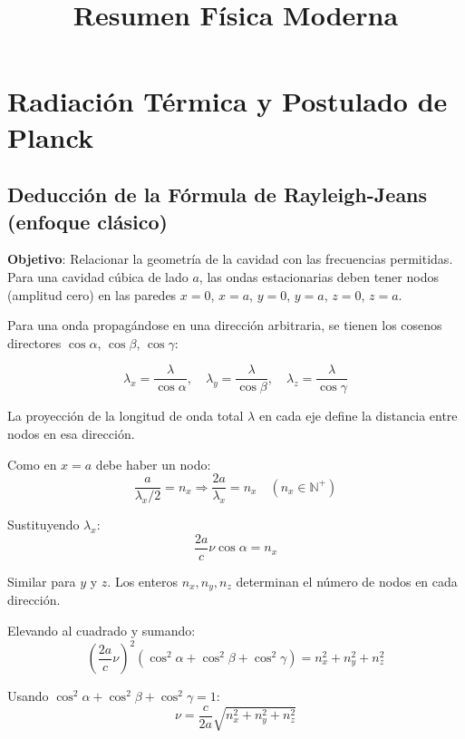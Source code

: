 \documentclass{article}
\title{Resumen Física Moderna}
\author{}
\date{}
\begin{document}
	\maketitle
	
	\section{Radiación Térmica y Postulado de Planck}
	\subsection{Deducción de la Fórmula de Rayleigh-Jeans (enfoque clásico)}
	
	\textbf{Objetivo}: Relacionar la geometría de la cavidad con las frecuencias permitidas. Para una cavidad cúbica de lado \(a\), las ondas estacionarias deben tener nodos (amplitud cero) en las paredes \(x=0\), \(x=a\), \(y=0\), \(y=a\), \(z=0\), \(z=a\).

	Para una onda propagándose en una dirección arbitraria, se tienen los cosenos directores \(\cos\alpha\), \(\cos\beta\), \(\cos\gamma\):
	
	\begin{equation}
		\lambda_x = \frac{\lambda}{\cos\alpha},\quad \lambda_y = \frac{\lambda}{\cos\beta},\quad \lambda_z = \frac{\lambda}{\cos\gamma}
	\end{equation}
	
	La proyección de la longitud de onda total \(\lambda\) en cada eje define la distancia entre nodos en esa dirección.
	
	Como en \(x = a\) debe haber un nodo:
	\begin{equation}
		\frac{a}{\lambda_x/2} = n_x \Rightarrow \frac{2a}{\lambda_x} = n_x \quad (n_x \in \mathbb{N}^+)
	\end{equation}
	
	Sustituyendo \(\lambda_x\):
	\begin{equation}
		\frac{2a}{c}\nu\cos\alpha = n_x
	\end{equation}
	
	Similar para \(y\) y \(z\). Los enteros \(n_x, n_y, n_z\) determinan el número de nodos en cada dirección.
	
	Elevando al cuadrado y sumando:
	\begin{equation}
		\left(\frac{2a}{c}\nu\right)^2(\cos^2\alpha + \cos^2\beta + \cos^2\gamma) = n_x^2 + n_y^2 + n_z^2
	\end{equation}
	
	Usando \(\cos^2\alpha + \cos^2\beta + \cos^2\gamma = 1\):
	\begin{equation}
		\nu = \frac{c}{2a}\sqrt{n_x^2 + n_y^2 + n_z^2}
	\end{equation}
	
\end{document}
